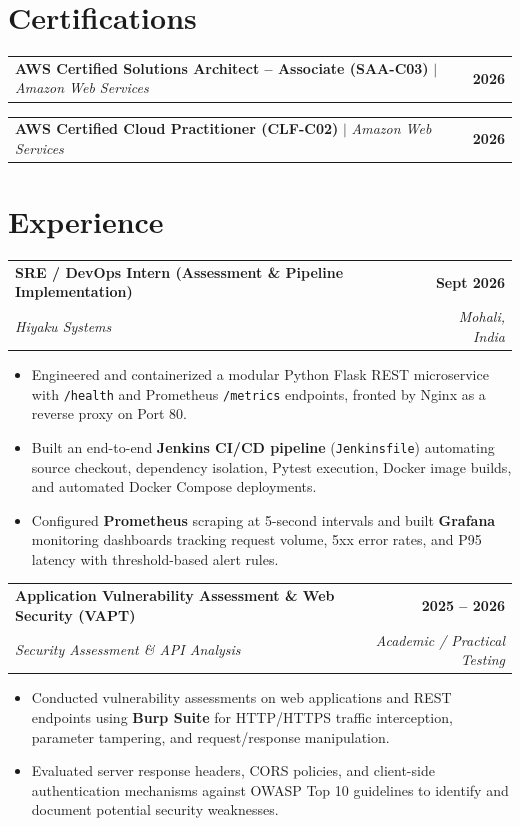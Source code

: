 \documentclass[letterpaper,9.8pt]{article}
\makeatletter
\newcommand{\resumeItemListStart}{\begin{itemize}[leftmargin=0.18in, labelsep=0.06in, itemsep=0.8pt, topsep=0.5pt, parsep=0pt, partopsep=0pt]}
\newcommand{\resumeItemListEnd}{\end{itemize}\vspace{2pt}}
\newcommand{\resumeExpHeader}[4]{
  \vspace{1pt}
  \begin{tabular*}{1.0\textwidth}[t]{l@{\extracolsep{\fill}}r}
    \textbf{#1} & \textbf{\small #2} \\
    \textit{\small #3} & \textit{\small #4} \\
  \end{tabular*}\vspace{-3.5pt}
}
\newcommand{\resumeCertHeader}[3]{
  \vspace{0.5pt}
  \begin{tabular*}{1.0\textwidth}[t]{l@{\extracolsep{\fill}}r}
    \textbf{#1} $\vert$ \textit{\small #2} & \textbf{\small #3} \\
  \end{tabular*}\vspace{-3.5pt}
}
\makeatother
\begin{document}
\section{Certifications}
\resumeCertHeader{AWS Certified Solutions Architect -- Associate (SAA-C03)}{Amazon Web Services}{2026}
\resumeCertHeader{AWS Certified Cloud Practitioner (CLF-C02)}{Amazon Web Services}{2026}
\vspace{2pt}

\section{Experience}
\resumeExpHeader{SRE / DevOps Intern (Assessment \& Pipeline Implementation)}{Sept 2026}{Hiyaku Systems}{Mohali, India}
\resumeItemListStart
  \item \small{Engineered and containerized a modular Python Flask REST microservice with \texttt{/health} and Prometheus \texttt{/metrics} endpoints, fronted by Nginx as a reverse proxy on Port 80.}
  \item \small{Built an end-to-end \textbf{Jenkins CI/CD pipeline} (\texttt{Jenkinsfile}) automating source checkout, dependency isolation, Pytest execution, Docker image builds, and automated Docker Compose deployments.}
  \item \small{Configured \textbf{Prometheus} scraping at 5-second intervals and built \textbf{Grafana} monitoring dashboards tracking request volume, 5xx error rates, and P95 latency with threshold-based alert rules.}
\resumeItemListEnd

\resumeExpHeader{Application Vulnerability Assessment \& Web Security (VAPT)}{2025 -- 2026}{Security Assessment \& API Analysis}{Academic / Practical Testing}
\resumeItemListStart
  \item \small{Conducted vulnerability assessments on web applications and REST endpoints using \textbf{Burp Suite} for HTTP/HTTPS traffic interception, parameter tampering, and request/response manipulation.}
  \item \small{Evaluated server response headers, CORS policies, and client-side authentication mechanisms against OWASP Top 10 guidelines to identify and document potential security weaknesses.}
\resumeItemListEnd

\end{document}
